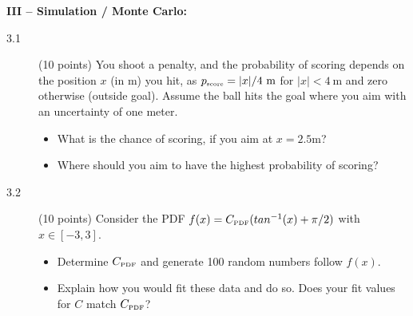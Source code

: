 \documentclass[11pt]{article}
\begin{document}

\newpage
\noindent
{\bf III -- Simulation / Monte Carlo:}
\vspace*{-1ex}
\begin{description}
%
  \item[3.1] (10 points)
    You shoot a penalty, and the probability of scoring depends on the position $x$ (in m) you hit, as
    $p_{\mbox{\tiny score}} = |x| / 4~\mbox{m}$ for $|x| < 4~\mbox{m}$ and zero otherwise (outside goal).
    Assume the ball hits the goal where you aim with an uncertainty of one meter.
  \vspace*{-1ex}
  \begin{itemize}
    \item What is the chance of scoring, if you aim at $x = 2.5$m?
    \item Where should you aim to have the highest probability of scoring?
  \end{itemize}
%
  \item[3.2] (10 points) Consider the PDF $f(x) = C_{\mbox{\tiny PDF}} (tan^{-1}(x)+\pi/2)$ with $x \in [-3,3]$.
  \vspace*{-1ex}
  \begin{itemize}
    \item Determine $C_{\mbox{\tiny PDF}}$ and generate 100 random numbers follow $f(x)$.
    \item Explain how you would fit these data and do so. Does your fit values for $C$ match $C_{\mbox{\tiny PDF}}$?
  \end{itemize}
\end{description}


\end{document}
